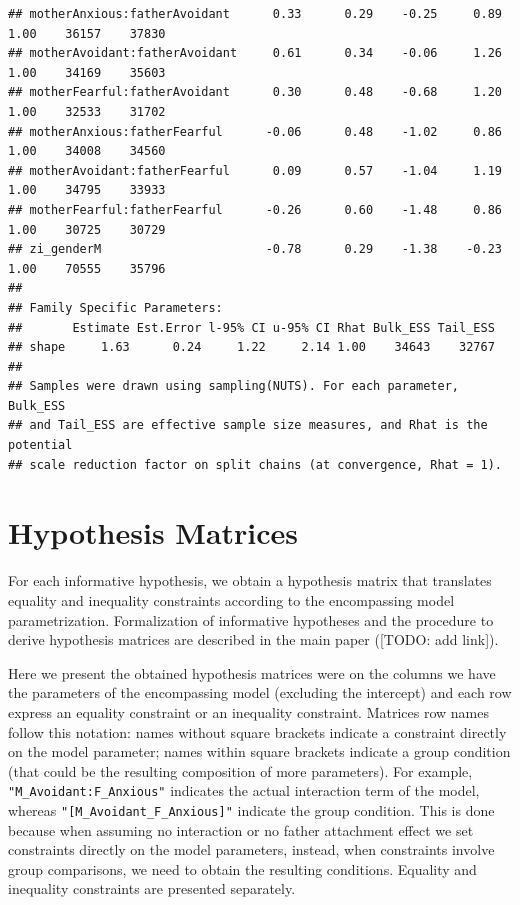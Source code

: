 \documentclass[
]{book}
\begin{document}
\begin{verbatim}
## motherAnxious:fatherAvoidant      0.33      0.29    -0.25     0.89 1.00    36157    37830
## motherAvoidant:fatherAvoidant     0.61      0.34    -0.06     1.26 1.00    34169    35603
## motherFearful:fatherAvoidant      0.30      0.48    -0.68     1.20 1.00    32533    31702
## motherAnxious:fatherFearful      -0.06      0.48    -1.02     0.86 1.00    34008    34560
## motherAvoidant:fatherFearful      0.09      0.57    -1.04     1.19 1.00    34795    33933
## motherFearful:fatherFearful      -0.26      0.60    -1.48     0.86 1.00    30725    30729
## zi_genderM                       -0.78      0.29    -1.38    -0.23 1.00    70555    35796
## 
## Family Specific Parameters: 
##       Estimate Est.Error l-95% CI u-95% CI Rhat Bulk_ESS Tail_ESS
## shape     1.63      0.24     1.22     2.14 1.00    34643    32767
## 
## Samples were drawn using sampling(NUTS). For each parameter, Bulk_ESS
## and Tail_ESS are effective sample size measures, and Rhat is the potential
## scale reduction factor on split chains (at convergence, Rhat = 1).
\end{verbatim}

\hypertarget{hypothesis-matrices}{%
\section{Hypothesis Matrices}\label{hypothesis-matrices}}

For each informative hypothesis, we obtain a hypothesis matrix that translates equality and inequality constraints according to the encompassing model parametrization. Formalization of informative hypotheses and the procedure to derive hypothesis matrices are described in the main paper ({[}TODO: add link{]}).

Here we present the obtained hypothesis matrices were on the columns we have the parameters of the encompassing model (excluding the intercept) and each row express an equality constraint or an inequality constraint. Matrices row names follow this notation: names without square brackets indicate a constraint directly on the model parameter; names within square brackets indicate a group condition (that could be the resulting composition of more parameters). For example, \texttt{"M\_Avoidant:F\_Anxious"} indicates the actual interaction term of the model, whereas \texttt{"{[}M\_Avoidant\_F\_Anxious{]}"} indicate the group condition. This is done because when assuming no interaction or no father attachment effect we set constraints directly on the model parameters, instead, when constraints involve group comparisons, we need to obtain the resulting conditions. Equality and inequality constraints are presented separately.
\end{document}
